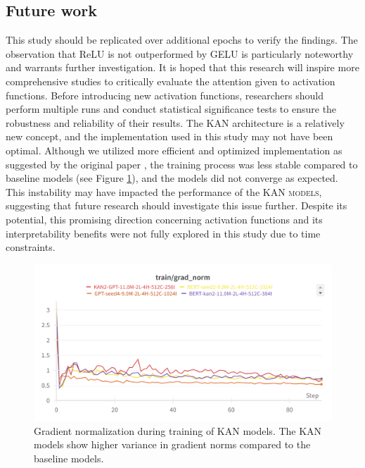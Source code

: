 \subsection{Future work}
\label{sec:future}
This study should be replicated over additional epochs to verify the findings. The observation that ReLU is not outperformed by GELU is particularly noteworthy and warrants further investigation. It is hoped that this research will inspire more comprehensive studies to critically evaluate the attention given to activation functions. Before introducing new activation functions, researchers should perform multiple runs and conduct statistical significance tests to ensure the robustness and reliability of their results.
The KAN architecture is a relatively new concept, and the implementation used in this study may not have been optimal. Although we utilized more efficient and optimized implementation as suggested by the original paper \cite{Liu2024}, the training process was less stable compared to baseline models (see Figure \ref{fig:grad-norm}), and the models did not converge as expected. This instability may have impacted the performance of the \textsc{KAN models}, suggesting that future research should investigate this issue further. Despite its potential, this promising direction concerning activation functions and its interpretability benefits were not fully explored in this study due to time constraints.

\begin{figure}[ht]
    \centering
    \includegraphics[width=\columnwidth]{figures/train-grad-norm.png}
    \caption{Gradient normalization during training of KAN models. The KAN models show higher variance in gradient norms compared to the baseline models.}
    \label{fig:grad-norm}
\end{figure}

